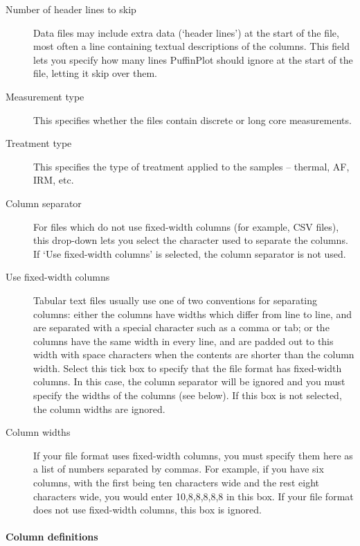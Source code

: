 \documentclass[a4paper,british]{article}
\begin{document}
\begin{description}

\item[Number of header lines to skip] Data files may include extra data
  (`header lines') at the start of the file, most often a line containing
  textual descriptions of the columns. This field lets you specify how many
  lines PuffinPlot should ignore at the start of the file, letting it
  skip over them.

\item[Measurement type] This specifies whether the files contain discrete
  or long core measurements.

\item[Treatment type] This specifies the type of treatment applied to
  the samples -- thermal, AF, IRM, etc.

\item[Column separator] For files which do not use fixed-width columns (for
  example, CSV files), this drop-down lets you select the character used
  to separate the columns. If `Use fixed-width columns' is selected, the
  column separator is not used.

\item[Use fixed-width columns] Tabular text files usually use one of two
  conventions for separating columns: either the columns have widths which
  differ from line to line, and are separated with a special character such
  as a comma or tab; or the columns have the same width in every line, and
  are padded out to this width with space characters when the contents are
  shorter than the column width. Select this tick box to specify that the
  file format has fixed-width columns. In this case, the column separator will
  be ignored and you must specify the widths of the columns (see below).
  If this box is not selected, the column widths are ignored.

\item[Column widths] If your file format uses fixed-width columns, you must
  specify them here as a list of numbers separated by commas. For example, if
  you have six columns, with the first being ten characters wide and the rest
  eight characters wide, you would enter 10,8,8,8,8,8 in this box. If your
  file format does not use fixed-width columns, this box is ignored.

\end{description}

\paragraph{Column definitions}
\end{document}
